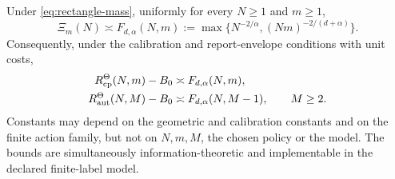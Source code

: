 \begin{theorem}\label{thm:geometry}
Under \eqref{eq:rectangle-mass}, uniformly for every $N\ge1$ and $m\ge1$,
\begin{equation}\label{eq:profile-crossover}
 \Xi_m(N)\asymp
 F_{d,\alpha}(N,m):=
 \max\{N^{-2/\alpha},(Nm)^{-2/(d+\alpha)}\}.
\end{equation}
Consequently, under the calibration and report-envelope conditions with unit costs,
\begin{align}
 R_{\mathrm{cp}}^\Theta(N,m)-B_0&\asymp F_{d,\alpha}(N,m),\label{eq:crossover-cp}\\
 R_{\mathrm{aut}}^\Theta(N,M)-B_0&\asymp F_{d,\alpha}(N,M-1),\qquad M\ge2.
 \label{eq:crossover-aut}
\end{align}
Constants may depend on the geometric and calibration constants and on the finite action family, but not on $N,m,M$, the chosen policy or the model. The bounds are simultaneously information-theoretic and implementable in the declared finite-label model.
\end{theorem}
